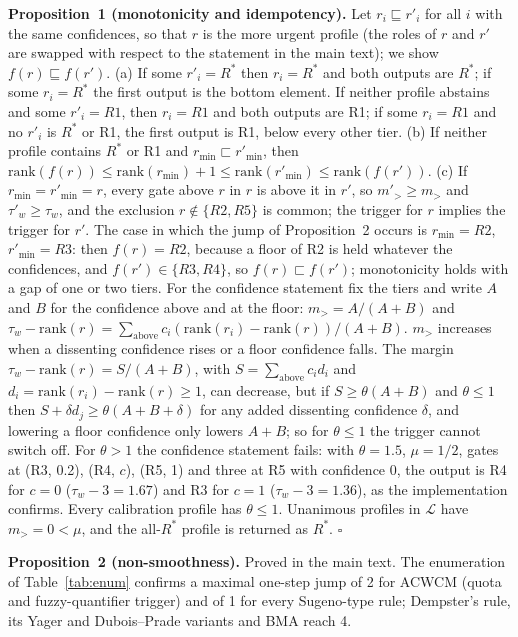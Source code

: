 \documentclass[11pt,a4paper]{article}%
\begin{document}
\textbf{Proposition~1 (monotonicity and idempotency).} Let $r_i\sqsubseteq r'_i$ for all $i$ with the same confidences, so that $r$ is the more urgent profile (the roles of $r$ and $r'$ are swapped with respect to the statement in the main text); we show $f(r)\sqsubseteq f(r')$. (a) If some $r'_i=R^*$ then $r_i=R^*$ and both outputs are $R^*$; if some $r_i=R^*$ the first output is the bottom element. If neither profile abstains and some $r'_i=R1$, then $r_i=R1$ and both outputs are R1; if some $r_i=R1$ and no $r'_i$ is $R^*$ or R1, the first output is R1, below every other tier. (b) If neither profile contains $R^*$ or R1 and $r_{\min}\sqsubset r'_{\min}$, then $\text{rank}(f(r))\le\text{rank}(r_{\min})+1\le\text{rank}(r'_{\min})\le\text{rank}(f(r'))$. (c) If $r_{\min}=r'_{\min}=r$, every gate above $r$ in $r$ is above it in $r'$, so $m'_>\ge m_>$ and $\tau'_w\ge\tau_w$, and the exclusion $r\notin\{R2,R5\}$ is common; the trigger for $r$ implies the trigger for $r'$. The case in which the jump of Proposition~2 occurs is $r_{\min}=R2$, $r'_{\min}=R3$: then $f(r)=R2$, because a floor of R2 is held whatever the confidences, and $f(r')\in\{R3,R4\}$, so $f(r)\sqsubset f(r')$; monotonicity holds with a gap of one or two tiers. For the confidence statement fix the tiers and write $A$ and $B$ for the confidence above and at the floor: $m_>=A/(A+B)$ and $\tau_w-\text{rank}(r)=\sum_{\text{above}}c_i(\text{rank}(r_i)-\text{rank}(r))/(A+B)$. $m_>$ increases when a dissenting confidence rises or a floor confidence falls. The margin $\tau_w-\text{rank}(r)=S/(A+B)$, with $S=\sum_{\text{above}}c_id_i$ and $d_i=\text{rank}(r_i)-\text{rank}(r)\ge1$, can decrease, but if $S\ge\theta(A+B)$ and $\theta\le1$ then $S+\delta d_j\ge\theta(A+B+\delta)$ for any added dissenting confidence $\delta$, and lowering a floor confidence only lowers $A+B$; so for $\theta\le1$ the trigger cannot switch off. For $\theta>1$ the confidence statement fails: with $\theta=1.5$, $\mu=1/2$, gates at (R3, 0.2), (R4, $c$), (R5, 1) and three at R5 with confidence 0, the output is R4 for $c=0$ ($\tau_w-3=1.67$) and R3 for $c=1$ ($\tau_w-3=1.36$), as the implementation confirms. Every calibration profile has $\theta\le1$. Unanimous profiles in $\mathcal{L}$ have $m_>=0<\mu$, and the all-$R^*$ profile is returned as $R^*$. $\square$

\textbf{Proposition~2 (non-smoothness).} Proved in the main text. The enumeration of Table~\ref{tab:enum} confirms a maximal one-step jump of 2 for ACWCM (quota and fuzzy-quantifier trigger) and of 1 for every Sugeno-type rule; Dempster's rule, its Yager and Dubois--Prade variants and BMA reach 4.
\end{document}
